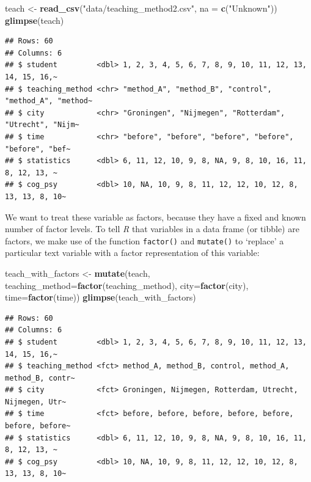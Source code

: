 \documentclass[
]{scrartcl}
\newenvironment{Shaded}{\begin{snugshade}}{\end{snugshade}}
\newcommand{\AttributeTok}[1]{\textcolor[rgb]{0.13,0.29,0.53}{#1}}
\newcommand{\FunctionTok}[1]{\textcolor[rgb]{0.13,0.29,0.53}{\textbf{#1}}}
\newcommand{\NormalTok}[1]{#1}
\newcommand{\OtherTok}[1]{\textcolor[rgb]{0.56,0.35,0.01}{#1}}
\newcommand{\StringTok}[1]{\textcolor[rgb]{0.31,0.60,0.02}{#1}}
\begin{document}
\begin{Shaded}
\begin{Highlighting}[]
\NormalTok{teach }\OtherTok{\textless{}{-}} \FunctionTok{read\_csv}\NormalTok{(}\StringTok{"data/teaching\_method2.csv"}\NormalTok{, }\AttributeTok{na =} \FunctionTok{c}\NormalTok{(}\StringTok{"Unknown"}\NormalTok{))}
\FunctionTok{glimpse}\NormalTok{(teach)}
\end{Highlighting}
\end{Shaded}

\begin{verbatim}
## Rows: 60
## Columns: 6
## $ student         <dbl> 1, 2, 3, 4, 5, 6, 7, 8, 9, 10, 11, 12, 13, 14, 15, 16,~
## $ teaching_method <chr> "method_A", "method_B", "control", "method_A", "method~
## $ city            <chr> "Groningen", "Nijmegen", "Rotterdam", "Utrecht", "Nijm~
## $ time            <chr> "before", "before", "before", "before", "before", "bef~
## $ statistics      <dbl> 6, 11, 12, 10, 9, 8, NA, 9, 8, 10, 16, 11, 8, 12, 13, ~
## $ cog_psy         <dbl> 10, NA, 10, 9, 8, 11, 12, 12, 10, 12, 8, 13, 13, 8, 10~
\end{verbatim}

We want to treat these variable as factors, because they have a fixed and known number of factor levels. To tell \emph{R} that variables in a data frame (or tibble) are factors, we make use of the function \texttt{factor()} and \texttt{mutate()} to `replace' a particular text variable with a factor representation of this variable:

\begin{Shaded}
\begin{Highlighting}[]
\NormalTok{teach\_with\_factors }\OtherTok{\textless{}{-}} \FunctionTok{mutate}\NormalTok{(teach,}
                       \AttributeTok{teaching\_method=}\FunctionTok{factor}\NormalTok{(teaching\_method),}
                       \AttributeTok{city=}\FunctionTok{factor}\NormalTok{(city),}
                       \AttributeTok{time=}\FunctionTok{factor}\NormalTok{(time))}
\FunctionTok{glimpse}\NormalTok{(teach\_with\_factors)}
\end{Highlighting}
\end{Shaded}

\begin{verbatim}
## Rows: 60
## Columns: 6
## $ student         <dbl> 1, 2, 3, 4, 5, 6, 7, 8, 9, 10, 11, 12, 13, 14, 15, 16,~
## $ teaching_method <fct> method_A, method_B, control, method_A, method_B, contr~
## $ city            <fct> Groningen, Nijmegen, Rotterdam, Utrecht, Nijmegen, Utr~
## $ time            <fct> before, before, before, before, before, before, before~
## $ statistics      <dbl> 6, 11, 12, 10, 9, 8, NA, 9, 8, 10, 16, 11, 8, 12, 13, ~
## $ cog_psy         <dbl> 10, NA, 10, 9, 8, 11, 12, 12, 10, 12, 8, 13, 13, 8, 10~
\end{verbatim}
\end{document}
